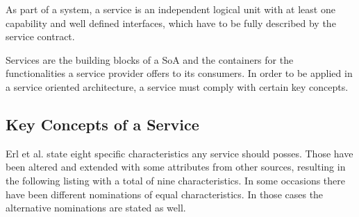 \begin{myquote}
	As part of a system, a service is an independent logical unit with at least one capability and well defined interfaces, which have to be fully described by the service contract.

	Services are the building blocks of a SoA and the containers for the functionalities a service provider offers to its consumers. In order to be applied in a service oriented architecture, a service must comply with certain key concepts.
\end{myquote}



\subsection{Key Concepts of a Service}
\label{sec:service-concepts}
Erl et al. \cite[p.27]{erl2011} state eight specific characteristics any service should posses. Those have been altered and extended with some attributes from other sources, resulting in the following listing with a total of nine characteristics. In some occasions there have been different nominations of equal characteristics. In those cases the alternative nominations are stated as well.

